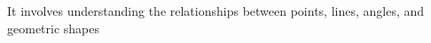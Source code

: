 \documentclass[preview]{standalone}
\begin{document}
\begin{center}
It involves understanding the relationships between points, lines, angles, and geometric shapes
\end{center}
\end{document}
